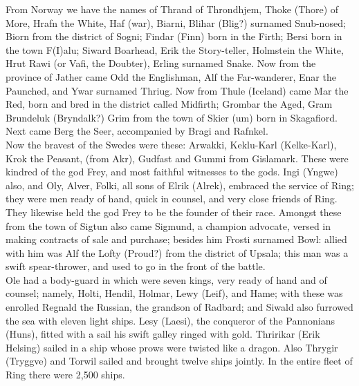 \documentclass[10pt,a4paper]{report}
\begin{document}
From Norway we have the names of Thrand of Throndhjem, Thoke (Thore) of More, Hrafn the White, Haf (war), Biarni, Blihar (Blig?) surnamed Snub-nosed; Biorn from the district of Sogni; Findar (Finn) born in the Firth; Bersi born in the town F(I)alu; Siward Boarhead, Erik the Story-teller, Holmstein the White, Hrut Rawi (or Vafi, the Doubter), Erling surnamed Snake. Now from the province of Jather came Odd the Englishman, Alf the Far-wanderer, Enar the Paunched, and Ywar surnamed Thriug. Now from Thule (Iceland) came Mar the Red, born and bred in the district called Midfirth; Grombar the Aged, Gram Brundeluk (Bryndalk?) Grim from the town of Skier (um) born in Skagafiord. Next came Berg the Seer, accompanied by Bragi and Rafnkel.\\

Now the bravest of the Swedes were these: Arwakki, Keklu-Karl (Kelke-Karl), Krok the Peasant, (from Akr), Gudfast and Gummi from Gislamark. These were kindred of the god Frey, and most faithful witnesses to the gods. Ingi (Yngwe) also, and Oly, Alver, Folki, all sons of Elrik (Alrek), embraced the service of Ring; they were men ready of hand, quick in counsel, and very close friends of Ring. They likewise held the god Frey to be the founder of their race. Amongst these from the town of Sigtun also came Sigmund, a champion advocate, versed in making contracts of sale and purchase; besides him Frosti surnamed Bowl: allied with him was Alf the Lofty (Proud?) from the district of Upsala; this man was a swift spear-thrower, and used to go in the front of the battle.\\

Ole had a body-guard in which were seven kings, very ready of hand and of counsel; namely, Holti, Hendil, Holmar, Lewy (Leif), and Hame; with these was enrolled Regnald the Russian, the grandson of Radbard; and Siwald also furrowed the sea with eleven light ships. Lesy (Laesi), the conqueror of the Pannonians (Huns), fitted with a sail his swift galley ringed with gold. Thririkar (Erik Helsing) sailed in a ship whose prows were twisted like a dragon. Also Thrygir (Tryggve) and Torwil sailed and brought twelve ships jointly. In the entire fleet of Ring there were 2,500 ships.\\
\end{document}
